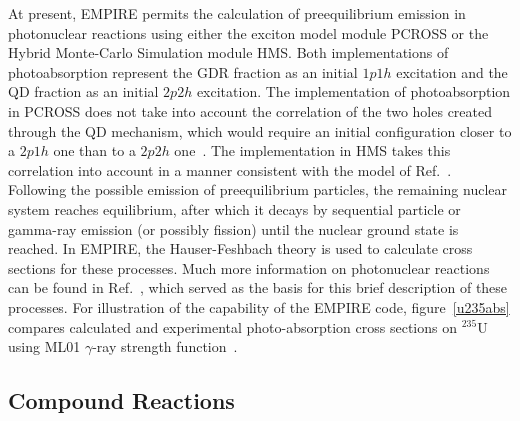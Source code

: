 \documentclass[twocolumn,amsmath,amssymb,10pt,groupedaddress,a4paper]{revtex4}
\begin{document}
At present, EMPIRE permits the calculation of
preequilibrium emission in photonuclear reactions using either the
exciton model module PCROSS or the Hybrid Monte-Carlo
Simulation module HMS. Both implementations of photoabsorption
represent the GDR fraction as an initial $1p1h$ excitation and the
QD fraction as an initial $2p2h$ excitation. The implementation of
photoabsorption in PCROSS does not take into account the correlation
of the two holes created through the QD mechanism, which would require
an initial configuration closer to a $2p1h$ one than to a $2p2h$
one~\cite{PHNuc}. The implementation in HMS takes this correlation
into account in a manner consistent with the model of Ref.~\cite{chadQD}.
Following the possible emission of preequilibrium particles, the remaining
nuclear system reaches equilibrium, after which it decays by sequential
particle or gamma-ray emission (or possibly fission) until the nuclear
ground state is reached. In EMPIRE, the Hauser-Feshbach theory is
used to calculate cross sections for these processes.
Much more information on photonuclear reactions can be found in
Ref.~\cite{PHNuc}, which served as the basis for this brief description
of these processes.
For illustration of the capability of the EMPIRE code, figure~\ref{u235abs}
compares calculated and experimental photo-absorption
cross sections on $^{235}$U using ML01 $\gamma$-ray strength
function~\cite{mike2}.



\subsection{Compound Reactions}
\end{document}
